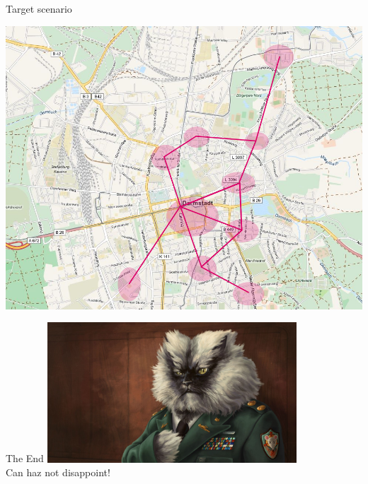 \documentclass{beamer}
\begin{document}
\begin{frame}{Target scenario}
\begin{center}
\includegraphics[height=0.8\textheight]{target}
\end{center}
\end{frame}

\begin{frame}{The End}
\vfill
\centering
\includegraphics[width=0.7\textwidth]{mehro} \\
Can haz not disappoint!
\vfill
\end{frame}
\end{document}
